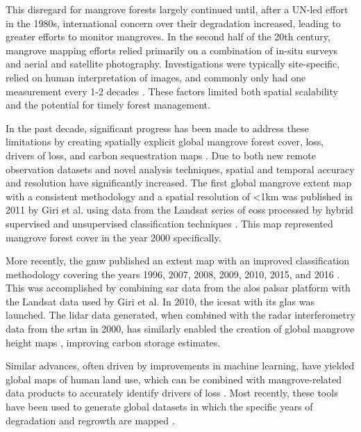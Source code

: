 This disregard for mangrove forests largely continued until, after a UN-led effort in the 1980s, international concern over their degradation increased, leading to greater efforts to monitor mangroves. In the second half of the 20th century, mangrove mapping efforts relied primarily on a combination of in-situ surveys and aerial and satellite photography. Investigations were typically site-specific, relied on human interpretation of images, and commonly only had one measurement every 1-2 decades \cite{lacerdaluizandmenezesmarceloandmussimolisanimauricioChangesMangroveExtension2007, fromardHalfCenturyDynamic2004}. These factors limited both spatial scalability and the potential for timely forest management. 


In the past decade, significant progress has been made to address these limitations by creating spatially explicit global mangrove forest cover, loss, drivers of loss, and carbon sequestration maps \cite{spaldingWorldAtlasMangroves2010, donatoMangrovesMostCarbonrich2011, sandermanGlobalMapMangrove2018, simardMangroveCanopyHeight2019, goldbergGlobalDeclinesHuman2020}. Due to both new remote observation datasets and novel analysis techniques,   spatial and temporal accuracy and resolution have significantly increased. The first global mangrove extent map with a consistent methodology and a spatial resolution of <1km was published in 2011 by Giri et al. using data from the Landsat series of \acp{eos} processed by hybrid supervised and unsupervised classification techniques \cite{giriStatusDistributionMangrove2011}. This map represented mangrove forest cover in the year 2000 specifically. 

More recently, the \ac{gmw} published an extent map with an improved classification methodology covering the years 1996, 2007, 2008, 2009, 2010, 2015, and 2016 \cite{buntingGlobalMangroveWatch2018}. This was accomplished by combining \ac{sar} data from the \ac{alos} \ac{palsar} platform with the Landsat data used by Giri et al. In 2010, the \ac{icesat} with its \ac{glas} was launched. The lidar data generated, when combined with the radar interferometry data from the \ac{srtm} in 2000, has similarly enabled the creation of global mangrove height maps \cite{simardMangroveCanopyHeight2019}, improving carbon storage estimates. 

Similar advances, often driven by improvements in machine learning, have yielded global maps of human land use, which can be combined with mangrove-related data products to accurately identify drivers of loss \cite{goldbergGlobalDeclinesHuman2020}. Most recently, these tools have been used to generate global datasets in which the specific years of degradation and regrowth are mapped \cite{vancutsemLongterm199020192021}.

